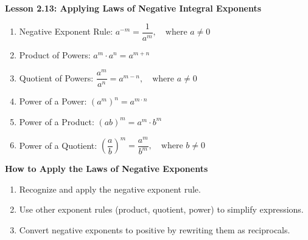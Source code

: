 \begin{center}
\textbf{Lesson 2.13: Applying Laws of Negative Integral Exponents}
\end{center}

\vspace*{1ex}

\begin{enumerate}[noitemsep, label = \color{blue}\arabic*. ]
    \item Negative Exponent Rule: \( a^{-m} = \dfrac{1}{a^m}, \quad \text{where } a \neq 0 \)
    \item Product of Powers: \( a^m \cdot a^n = a^{m+n} \)
    \item Quotient of Powers:  \( \dfrac{a^m}{a^n} = a^{m-n}, \quad \text{where } a \neq 0 \)
    \item Power of a Power: \( (a^m)^n = a^{m \cdot n} \)
    \item Power of a Product: \( (ab)^m = a^m \cdot b^m \)
    \item Power of a Quotient: \( \left( \dfrac{a}{b} \right)^m = \dfrac{a^m}{b^m}, \quad \text{where } b \neq 0 \)
\end{enumerate}


\noindent\textbf{How to Apply the Laws of Negative Exponents}
\begin{enumerate}[noitemsep, label = \color{blue}\arabic*. ]
    \item Recognize and apply the negative exponent rule.
    \item Use other exponent rules (product, quotient, power) to simplify expressions.
    \item Convert negative exponents to positive by rewriting them as reciprocals.
\end{enumerate}


